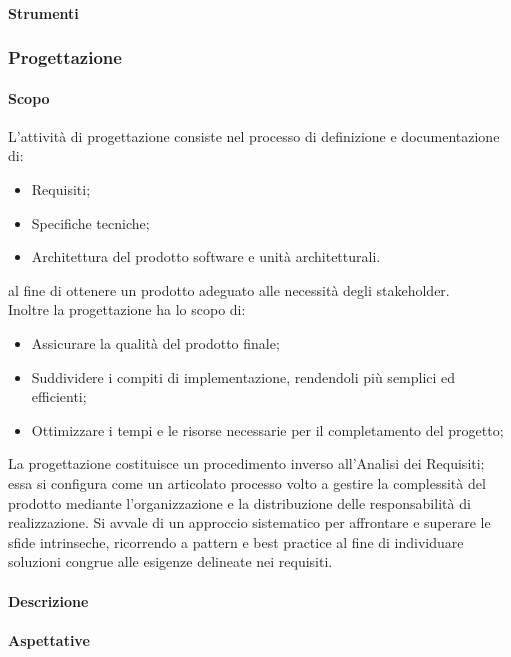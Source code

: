 \documentclass{article}
\begin{document}
\paragraph{Strumenti}

\subsubsection{Progettazione} 
\paragraph{Scopo}
L'attività di progettazione consiste nel processo di definizione e documentazione di:
\begin{itemize}
    \item Requisiti;
    \item Specifiche tecniche;
    \item Architettura del prodotto software e unità architetturali.
\end{itemize}
al fine di ottenere un prodotto adeguato alle necessità degli stakeholder. \\ 
Inoltre la progettazione ha lo scopo di:
\begin{itemize}
    \item Assicurare la qualità del prodotto finale;
    \item Suddividere i compiti di
    implementazione, rendendoli più semplici ed efficienti;
    \item Ottimizzare i tempi e le risorse necessarie per il completamento del progetto;
\end{itemize}

La progettazione costituisce un procedimento inverso all'Analisi dei Requisiti; essa si configura come un articolato processo volto a gestire la complessità del prodotto mediante l'organizzazione e la distribuzione delle responsabilità di realizzazione. Si avvale di un approccio sistematico per affrontare e superare le sfide intrinseche, ricorrendo a pattern e best practice al fine di individuare soluzioni congrue alle esigenze delineate nei requisiti.

\paragraph{Descrizione}

\paragraph{Aspettative}
\end{document}
